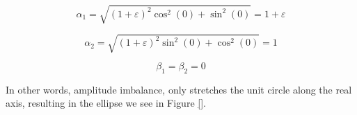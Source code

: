 \documentclass{article}
\begin{document}
\begin{equation}
	\alpha_1 = \sqrt{(1+\varepsilon)^2\cos^2(0)+\sin^2(0)} = 1 + \varepsilon
\end{equation}

\begin{equation}
	\alpha_2 = \sqrt{(1+\varepsilon)^2\sin^2(0)+\cos^2(0)} = 1
\end{equation}

\begin{equation}
	\beta_1 = \beta_2 = 0
\end{equation}

In other words, amplitude imbalance, only stretches the unit circle along the real axis, resulting in the ellipse we see in Figure \ref{}.
\end{document}
